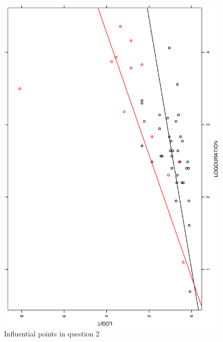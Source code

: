 \documentclass[a4paper,10pt]{article}
\begin{document}
\begin{figure}
\includegraphics[angle=-90, width=1\textwidth]{figures/math650_hw7_fig4.eps}
\caption{Influential points in question 2}\label{f4}
\end{figure}
\end{document}
